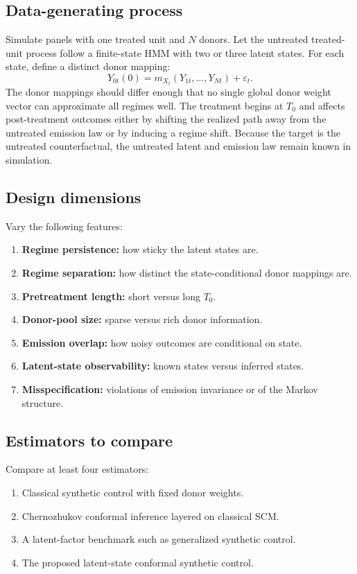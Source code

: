 \documentclass[11pt]{article}
\begin{document}
\subsection{Data-generating process}

Simulate panels with one treated unit and $N$ donors. Let the untreated treated-unit process follow a finite-state HMM with two or three latent states. For each state, define a distinct donor mapping:
\[
Y_{0t}(0)=m_{X_t}(Y_{1t},\dots,Y_{Nt})+\varepsilon_t.
\]
The donor mappings should differ enough that no single global donor weight vector can approximate all regimes well. The treatment begins at $T_0$ and affects post-treatment outcomes either by shifting the realized path away from the untreated emission law or by inducing a regime shift. Because the target is the untreated counterfactual, the untreated latent and emission law remain known in simulation.

\subsection{Design dimensions}

Vary the following features:

\begin{enumerate}[label=(\alph*)]
    \item \textbf{Regime persistence:} how sticky the latent states are.
    \item \textbf{Regime separation:} how distinct the state-conditional donor mappings are.
    \item \textbf{Pretreatment length:} short versus long $T_0$.
    \item \textbf{Donor-pool size:} sparse versus rich donor information.
    \item \textbf{Emission overlap:} how noisy outcomes are conditional on state.
    \item \textbf{Latent-state observability:} known states versus inferred states.
    \item \textbf{Misspecification:} violations of emission invariance or of the Markov structure.
\end{enumerate}

\subsection{Estimators to compare}

Compare at least four estimators:

\begin{enumerate}[label=\arabic*.]
    \item Classical synthetic control with fixed donor weights.
    \item Chernozhukov conformal inference layered on classical SCM.
    \item A latent-factor benchmark such as generalized synthetic control.
    \item The proposed latent-state conformal synthetic control.
\end{enumerate}
\end{document}
